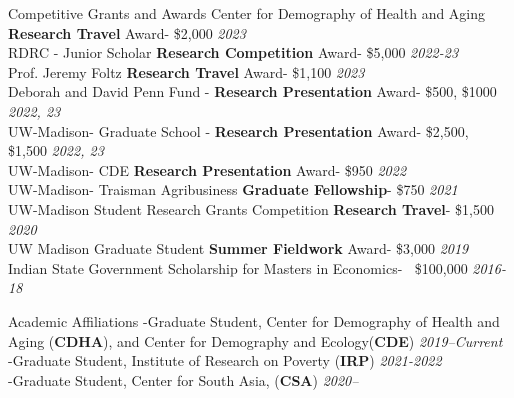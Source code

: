 \documentclass{resume} %
\begin{document}

\begin{rSection}{Competitive Grants and Awards}
Center for Demography of Health and Aging \textbf{Research Travel} Award- \$2,000 \hfill \textit{2023}	\\
RDRC - Junior Scholar \textbf{Research Competition} Award- \$5,000 \hfill \textit{2022-23}	\\
Prof. Jeremy Foltz \textbf{Research Travel} Award- \$1,100 \hfill \textit{2023}	\\
Deborah and David Penn Fund - \textbf{Research Presentation} Award- \$500, \$1000 \hfill \textit{2022, 23}	\\
UW-Madison- Graduate School - \textbf{Research Presentation} Award- \$2,500, \$1,500 \hfill \textit{2022, 23}	\\
UW-Madison- CDE \textbf{Research Presentation} Award- \$950 \hfill \textit{2022} \\
UW-Madison- Traisman Agribusiness \textbf{Graduate Fellowship}- \$750 \hfill \textit{2021}	\\
UW-Madison Student Research Grants Competition \textbf{Research Travel}- \$1,500 \hfill \textit{2020}  \\
UW Madison Graduate Student \textbf{Summer Fieldwork} Award- \$3,000  \hfill \textit{2019}\\
Indian State Government Scholarship for Masters in Economics- $~$ \$100,000 \hfill \textit{2016-18}

\end{rSection}

\begin{rSection}{Academic Affiliations}
-Graduate Student, Center for Demography of Health and Aging (\textbf{CDHA}), and Center for Demography and Ecology(\textbf{CDE})
 \hfill \textit{2019--Current}\\
-Graduate Student, Institute of Research on Poverty (\textbf{IRP})%
 \hfill \textit{2021-2022}\\
 -Graduate Student, Center for South Asia, (\textbf{CSA})%
 \hfill \textit{2020--}
\end{rSection}
\end{document}
